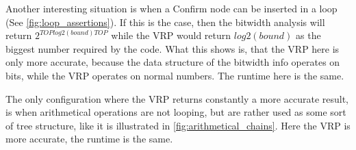 Another interesting situation is when a Confirm node can be inserted in a loop (See \ref{fig:loop_assertions}). If this is the case, then the bitwidth analysis will return $2^{TOP log2(bound) TOP}$ while the VRP would return $log2(bound)$ as the biggest number required by the code. What this shows is, that the VRP here is only more accurate, because the data structure of the bitwidth info operates on bits, while the VRP operates on normal numbers. The runtime here is the same.


\label{VRP_king}
The only configuration where the VRP returns constantly a more accurate result, is when arithmetical operations are not looping, but are rather used as some sort of tree structure, like it is illustrated in \ref{fig:arithmetical_chains}. Here the VRP is more accurate, the runtime is the same.

